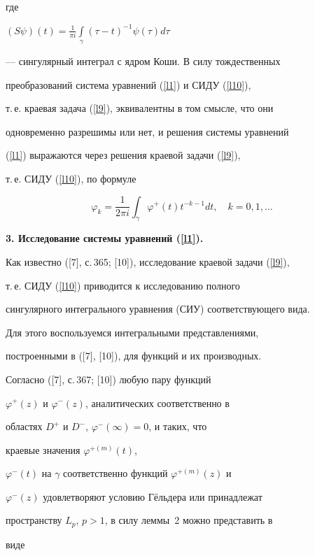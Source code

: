 где


$(S\psi)(t)=\frac{1}{\pi i}\int\limits_\gamma (\tau-t)^{-1}\psi(\tau)d\tau$


--- сингулярный интеграл с ядром Коши. В силу тождественных


преобразований система уравнений (\ref{l1}) и СИДУ (\ref{l10}),


т.\,е. краевая задача (\ref{l9}), эквивалентны в том смысле, что они


одновременно разрешимы или нет, и решения системы уравнений


(\ref{l1}) выражаются через решения краевой задачи (\ref{l9}),


т.\,е. СИДУ (\ref{l10}), по формуле


\begin{equation}\label{l11}


\varphi_k=\frac{1}{2\pi i}\int_\gamma


\varphi^+(t)t^{-k-1}dt,\quad k=0,1,\dotsc


\end{equation}


\medskip





{\bf 3. Исследование системы уравнений (\ref{l1}).}


Как известно ([7], с.\,365; [10]), исследование краевой задачи (\ref{l9}),


т.\,е. СИДУ (\ref{l10}) приводится к исследованию полного


сингулярного интегрального уравнения (СИУ) соответствующего вида.


Для этого воспользуемся интегральными представлениями,


построенными в ([7], [10]), для функций и их производных.


Согласно ([7], с.\,367; [10]) любую пару функций


$\varphi^+(z)$ и $\varphi^-(z)$, аналитических соответственно в


областях $D^+$ и $D^-$, $\varphi^-(\infty)=0$, и таких, что


краевые значения  $\varphi^{+(m)}(t)$,


$\varphi^-(t)$ на $\gamma$ соответственно функций $\varphi^{+(m)}(z)$ и


$\varphi^-(z)$ удовлетворяют условию Г\"ельдера или принадлежат


пространству $L_p$, $p>1$, в силу леммы~2 можно представить в


виде


